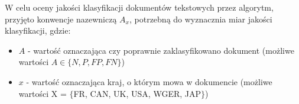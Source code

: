 \documentclass{classrep}
\begin{document}

W celu oceny jakości klasyfikacji dokumentów tekstowych \cite{teksty} przez algorytm, przyjęto konwencje nazewniczą $A_x$, potrzebną do wyznacznia miar jakości klasyfikacji, gdzie:
\begin{itemize}
\item $A$ - wartość oznaczająca czy poprawnie zaklasyfikowano dokument (możliwe wartości  $A \in \{N, P, FP, FN\}$)
\item $x$ - wartość oznaczająca kraj, o którym mowa w dokumencie (możliwe wartości X = $\{$FR, CAN, UK, USA, WGER, JAP$\}$)
\end{itemize} \hfill \break

\end{document}
